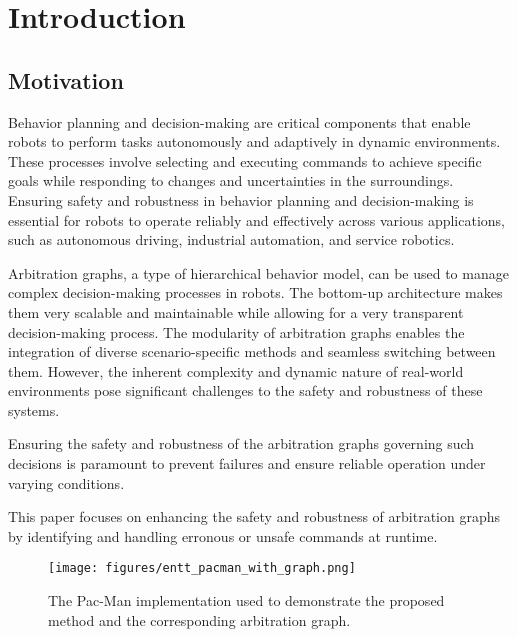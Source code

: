 \section{Introduction}

\subsection{Motivation}

Behavior planning and decision-making are critical components that enable robots to perform tasks autonomously and adaptively in dynamic environments.
These processes involve selecting and executing commands to achieve specific goals while responding to changes and uncertainties in the surroundings.
Ensuring safety and robustness in behavior planning and decision-making is essential for robots to operate reliably and effectively across various applications, such as autonomous driving, industrial automation, and service robotics.

Arbitration graphs, a type of hierarchical behavior model, can be used to manage complex decision-making processes in robots.
The bottom-up architecture makes them very scalable and maintainable while allowing for a very transparent decision-making process.
The modularity of arbitration graphs enables the integration of diverse scenario-specific methods and seamless switching between them.
However, the inherent complexity and dynamic nature of real-world environments pose significant challenges to the safety and robustness of these systems.

Ensuring the safety and robustness of the arbitration graphs governing such decisions is paramount to prevent failures and ensure reliable operation under varying conditions.

This paper focuses on enhancing the safety and robustness of arbitration graphs by identifying and handling erronous or unsafe commands at runtime.

\begin{figure}
    \centering
    \texttt{[image: figures/entt\_pacman\_with\_graph.png]}
    \caption{The Pac-Man implementation used to demonstrate the proposed method and the corresponding arbitration graph.}
    \label{fig:entt-pacman}
\end{figure}

